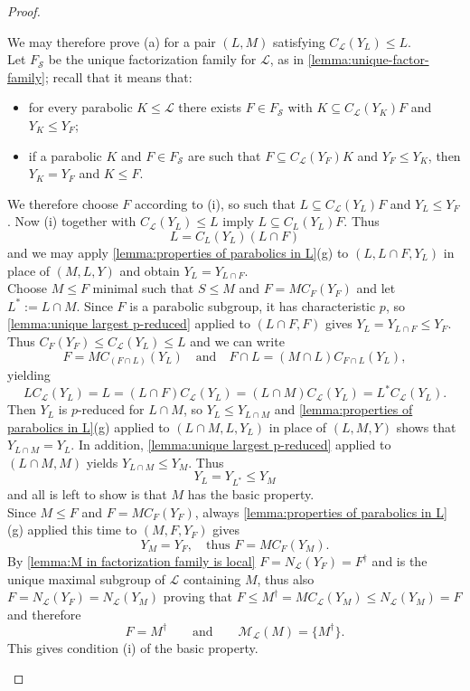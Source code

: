 \documentclass{amsart}
\numberwithin{equation}{section}
\theoremstyle{definition}
\theoremstyle{subresult}
\theoremstyle{caseresult}
\newcommand{\M}{\mathcal{M}}
\renewcommand{\L}{\mathcal{L}}
\renewcommand{\S}{\mathcal{S}}
\newcommand{\<}{\langle}
\renewcommand{\>}{\rangle}
\begin{document}
\begin{proof}
\begin{enumerate}[(a)]
		We may therefore prove (a) for a pair $(L,M)$ satisfying $C_\L(Y_L) \le L$.\\
		Let $F_\S$ be the unique factorization family for $\L$, as in \ref{lemma:unique-factor-family}; recall that it means that:
		\begin{itemize}
			\item[(i)] for every parabolic $K \le \L$ there exists $F \in F_\S$ with $K \subseteq C_\L(Y_K)F$ and $Y_K \le Y_F$;
			\item[(ii)] if a parabolic $K$ and $F \in F_\S$ are such that $F \subseteq C_\L(Y_F)K$ and $Y_F \le Y_K$, then $Y_K=Y_F$ and $K \le F$.
		\end{itemize}
		We therefore choose $F$ according to (i), so such that $L \subseteq C_\L(Y_L)F$ and $Y_L \le Y_F$. Now (i) together with $C_\L(Y_L) \le L$ imply $L \subseteq C_L(Y_L)F$. Thus
		\[
		L = C_L(Y_L)(L \cap F)
		\]
		and we may apply \ref{lemma:properties of parabolics in L}(g) to $(L, L \cap F, Y_L)$ in place of $(M,L,Y)$ and obtain $Y_L = Y_{L \cap F}$.\\
		Choose $M \le F$ minimal such that $S \le M$ and $F=MC_F(Y_F)$ and let $L^*:=L \cap M$. Since $F$ is a parabolic subgroup, it has characteristic $p$, so \ref{lemma:unique largest p-reduced} applied to $(L \cap F, F)$ gives $Y_L=Y_{L \cap F} \le Y_F$. Thus $C_F(Y_F) \le C_\L(Y_L) \le L$ and we can write
		\[
		F=M C_{(F \cap L)}(Y_L) \quad \text{and} \quad F \cap L = (M \cap L)C_{F \cap L}(Y_L),
		\]
		yielding
		\[
		LC_\L(Y_L) =L =  (L \cap F)C_\L(Y_L) = (L \cap M) C_\L(Y_L) = L^* C_\L(Y_L).
		\]
		Then $Y_L$ is $p$-reduced for $L \cap M$, so $Y_L \le Y_{L \cap M}$ and \ref{lemma:properties of parabolics in L}(g) applied to $(L \cap M, L, Y_L)$ in place of $(L,M,Y)$ shows that $Y_{L \cap M} = Y_L$. In addition, \ref{lemma:unique largest p-reduced} applied to $(L \cap M, M)$ yields $Y_{L \cap M} \le Y_M$. Thus
		\[
		Y_L = Y_{L^*} \le Y_M
		\]
		and all is left to show is that $M$ has the basic property.\\
		Since $M \le F$ and $F = MC_F(Y_F)$, always \ref{lemma:properties of parabolics in L}(g) applied this time to $(M,F,Y_F)$ gives 
		\[
		Y_M=Y_F, \quad \text{thus } F=MC_F(Y_M).
		\]
		By \ref{lemma:M in factorization family is local} $F = N_\L(Y_F) = F^\dagger$ and is the unique maximal subgroup of $\L$ containing $M$, thus also $F = N_\L(Y_F) = N_\L(Y_M)$ proving that $ F\le M^\dagger = M C_\L(Y_M) \le N_\L(Y_M) = F$ and therefore
		\[
		F = M^\dagger \qquad \text{and} \qquad\M_\L(M) = \{ M^\dagger \}.
		\]
		This gives condition (i) of the basic property.\\

\end{enumerate}
\end{proof}
\end{document}
